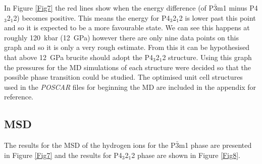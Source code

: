 \documentclass[a4paper,12pt]{article}
\begin{document}
In Figure \ref{Fig7} the red lines show when the energy difference (of P$\bar3$m1 minus P4$_3$2$_1$2) becomes positive. This means the energy for P4$_3$2$_1$2 is lower past this point and so it is expected to be a more favourable state. We can see this happens at roughly \SI{120}{\kilo\bar} (\SI{12}{\GPa}) however there are only nine data points on this graph and so it is only a very rough estimate. From this it can be hypothesised that above \SI{12}{\GPa} brucite should adopt the P4$_3$2$_1$2 structure. Using this graph the pressures for the MD simulations of each structure were decided so that the possible phase transition could be studied. The optimised unit cell structures used in the \textit{POSCAR} files for beginning the MD are included in the appendix for reference.

\subsection{MSD}

The results for the MSD of the hydrogen ions for the P$\bar{3}$m1 phase are presented in Figure \ref{Fig7} and the results for P4$_3$2$_1$2 phase are shown in Figure \ref{Fig8}.
\end{document}
